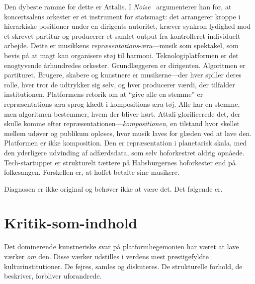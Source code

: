 \documentclass[10pt,letterpaper,twocolumn]{article}
\begin{document}
Den dybeste ramme for dette er Attalis. I \emph{Noise}~\citep{attali1985noise} argumenterer han for, at koncertsalens orkester er et instrument for statsmagt: det arrangerer kroppe i hierarkiske positioner under en dirigents autoritet, kræver synkron lydighed mod et skrevet partitur og producerer et samlet output fra kontrolleret individuelt arbejde. Dette er musikkens \emph{repræsentations}-æra---musik som spektakel, som bevis på at magt kan organisere støj til harmoni. Teknologiplatformen er det enogtyvende århundredes orkester. Grundlæggeren er dirigenten. Algoritmen er partituret. Brugere, skabere og kunstnere er musikerne---der hver spiller deres rolle, hver tror de udtrykker sig selv, og hver producerer værdi, der tilfalder institutionen. Platformens retorik om at ``give alle en stemme'' er repræsentations-æra-sprog klædt i kompositions-æra-tøj. Alle har en stemme, men algoritmen bestemmer, hvem der bliver hørt. Attali glorificerede det, der skulle komme efter repræsentationen---\emph{kompositionen}, en tilstand hvor skellet mellem udøver og publikum opløses, hvor musik laves for glæden ved at lave den. Platformen er ikke komposition. Den er repræsentation i planetarisk skala, med den yderligere udvinding af adfærdsdata, som selv hoforkestret aldrig opnåede. Tech-startuppet er strukturelt tættere på Habsburgernes hoforkester end på folkesangen. Forskellen er, at hoffet betalte sine musikere.

Diagnosen er ikke original og behøver ikke at være det. Det følgende er.

\section{Kritik-som-indhold}

Det dominerende kunstneriske svar på platformhegemonien har været at lave værker \emph{om} den. Disse værker udstilles i verdens mest prestigefyldte kulturinstitutioner. De fejres, samles og diskuteres. De strukturelle forhold, de beskriver, forbliver uforandrede.
\end{document}
